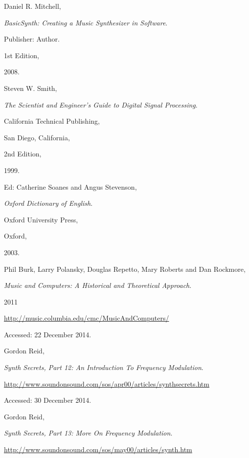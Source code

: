 \begin{thebibliography}{99}


  Daniel R. Mitchell,

  \emph{BasicSynth: Creating a Music Synthesizer in Software}.

  Publisher: Author.

  1st Edition,

  2008.


  Steven W. Smith,

  \emph{The Scientist and Engineer's Guide to Digital Signal Processing}.

  California Technical Publishing,

  San Diego, California,

  2nd Edition,

  1999.


  Ed: Catherine Soanes and Angus Stevenson,

  \emph{Oxford Dictionary of English}.

  Oxford University Press,

  Oxford,

  2003.


  Phil Burk, Larry Polansky, Douglas Repetto, Mary Roberts and Dan Rockmore,

  \emph{Music and Computers: A Historical and Theoretical Approach}.

  2011

  \url{http://music.columbia.edu/cmc/MusicAndComputers/}

  Accessed: 22 December 2014.


  Gordon Reid,

  \emph{Synth Secrets, Part 12: An Introduction To Frequency Modulation}.

  \url{http://www.soundonsound.com/sos/apr00/articles/synthsecrets.htm}

  Accessed: 30 December 2014.


  Gordon Reid,

  \emph{Synth Secrets, Part 13: More On Frequency Modulation}.

  \url{http://www.soundonsound.com/sos/may00/articles/synth.htm}


\end{thebibliography}
